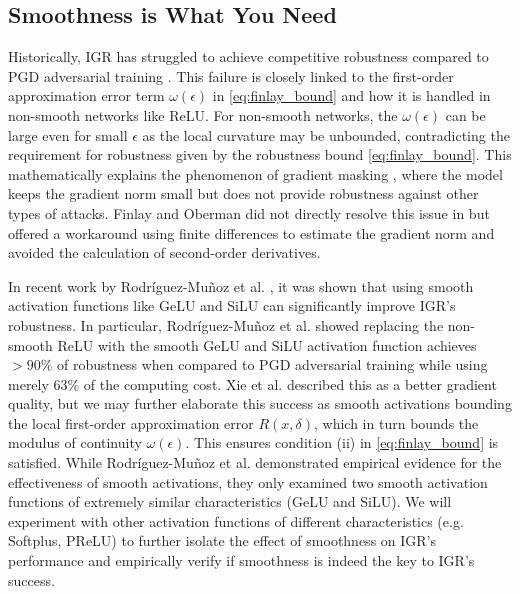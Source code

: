 \documentclass{article}
\begin{document}
\subsection{Smoothness is What You Need}

Historically, IGR has struggled to achieve competitive robustness compared to PGD adversarial training \cite{seck2019l1normdoublebackpropagation}. This failure is closely linked to the first-order approximation error term $\omega(\epsilon)$ in \eqref{eq:finlay_bound} and how it is handled in non-smooth networks like ReLU. For non-smooth networks, the $\omega(\epsilon)$ can be large even for small $\epsilon$ as the local curvature may be unbounded, contradicting the requirement for robustness given by the robustness bound \eqref{eq:finlay_bound}. This mathematically explains the phenomenon of gradient masking \cite{papernot2017practicalblackboxattacksmachine}, where the model keeps the gradient norm small but does not provide robustness against other types of attacks. Finlay and Oberman did not directly resolve this issue in \cite{finlay2019scaleableinputgradientregularization} but offered a workaround using finite differences to estimate the gradient norm and avoided the calculation of second-order derivatives.

In recent work by Rodríguez-Muñoz et al. \cite{rodríguezmuñoz2024characterizingmodelrobustnessnatural}, it was shown that using smooth activation functions like GeLU and SiLU can significantly improve IGR's robustness. In particular, Rodríguez-Muñoz et al. showed replacing the non-smooth ReLU with the smooth GeLU and SiLU activation function achieves $> 90\%$ of robustness when compared to PGD adversarial training while using merely $63\%$ of the computing cost. Xie et al. \cite{xie2021smoothadversarialtraining} described this as a better gradient quality, but we may further elaborate this success as smooth activations bounding the local first-order approximation error $R(x, \delta)$, which in turn bounds the modulus of continuity $\omega(\epsilon)$. This ensures condition (ii) in \eqref{eq:finlay_bound} is satisfied. While Rodríguez-Muñoz et al. demonstrated empirical evidence for the effectiveness of smooth activations, they only examined two smooth activation functions of extremely similar characteristics (GeLU and SiLU). We will experiment with other activation functions of different characteristics (e.g. Softplus, PReLU) to further isolate the effect of smoothness on IGR's performance and empirically verify if smoothness is indeed the key to IGR's success.
\end{document}
